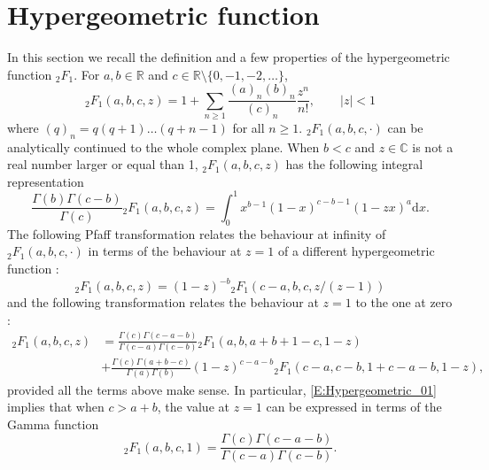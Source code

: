 \documentclass[11pt]{article}
\theoremstyle{remark}
\newcommand{\R}{\mathbb{R}}
\newcommand{\C}{\mathbb{C}}
\renewcommand{\d}{\mathrm{d}}
\numberwithin{equation}{section}
\begin{document}
\section{Hypergeometric function}

In this section we recall the definition and a few properties of the hypergeometric function ${}_2 F_1$.
For $a,b \in \R$ and $c \in \R \setminus \{0, -1, -2, \dots \}$,
\begin{equation}
\label{E:Hypergeometric}
{}_2 F_1(a,b,c,z) = 1 + \sum_{n \geq 1} \frac{(a)_n (b)_n}{(c)_n} \frac{z^n}{n!},
\quad \quad |z| < 1
\end{equation}
where $(q)_n = q(q+1) \dots (q+n-1)$ for all $n \geq 1$.
${}_2 F_1(a,b,c,\cdot)$ can be analytically continued to the whole complex plane.
When $b<c$ and $z \in \C$ is not a real number larger or equal than 1, ${}_2 F_1(a,b,c,z)$ has the following integral representation \cite[15.3.1]{special}
\begin{equation}
\label{E:Hypergeometric_integral}
\frac{\Gamma(b) \Gamma(c-b)}{\Gamma(c)} {}_2 F_1(a,b,c,z) = \int_0^1 x^{b-1} (1-x)^{c-b-1} (1-zx)^a \d x.
\end{equation}
The following Pfaff transformation relates the behaviour at infinity of ${}_2 F_1(a,b,c,\cdot)$ in terms of the behaviour at $z=1$ of a different hypergeometric function \cite[15.3.5]{special}:
\begin{equation}
\label{E:Hypergeometric_Pfaff}
{}_2 F_1(a,b,c,z) = (1-z)^{-b} {}_2 F_1(c-a,b,c,z/(z-1))
\end{equation}
and the following transformation relates the behaviour at $z=1$ to the one at zero \cite[15.3.6]{special}:
\begin{align}
\label{E:Hypergeometric_01}
{}_2 F_1(a,b,c,z)
& = \frac{\Gamma(c) \Gamma(c-a-b)}{\Gamma(c-a) \Gamma(c-b)} {}_2 F_1 (a,b,a+b+1-c,1-z) \\
& + \frac{\Gamma(c) \Gamma(a+b-c)}{\Gamma(a) \Gamma(b)} (1-z)^{c-a-b} {}_2 F_1 (c-a,c-b,1+c-a-b,1-z), \nonumber
\end{align}
provided all the terms above make sense. In particular, \eqref{E:Hypergeometric_01} implies that when $c>a+b$, the value at $z=1$ can be expressed in terms of the Gamma function \cite[15.1.20]{special}
\begin{equation}
\label{E:Hypergeometric_z=1}
{}_2 F_1(a,b,c,1) = \frac{\Gamma(c) \Gamma(c-a-b)}{\Gamma(c-a) \Gamma(c-b)}.
\end{equation}








\end{document}
